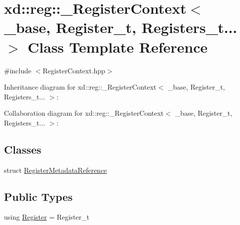 \hypertarget{classxd_1_1reg_1_1___register_context_3_01__base_00_01_register__t_00_01_registers__t_8_8_8_01_4}{}\section{xd\+:\+:reg\+:\+:\+\_\+\+Register\+Context$<$ \+\_\+base, Register\+\_\+t, Registers\+\_\+t... $>$ Class Template Reference}
\label{classxd_1_1reg_1_1___register_context_3_01__base_00_01_register__t_00_01_registers__t_8_8_8_01_4}


{\ttfamily \#include $<$Register\+Context.\+hpp$>$}



Inheritance diagram for xd\+:\+:reg\+:\+:\+\_\+\+Register\+Context$<$ \+\_\+base, Register\+\_\+t, Registers\+\_\+t... $>$\+:


Collaboration diagram for xd\+:\+:reg\+:\+:\+\_\+\+Register\+Context$<$ \+\_\+base, Register\+\_\+t, Registers\+\_\+t... $>$\+:
\subsection*{Classes}
\begin{DoxyCompactItemize}
\item 
struct \mbox{\hyperlink{structxd_1_1reg_1_1___register_context_3_01__base_00_01_register__t_00_01_registers__t_8_8_8_01_fe5bcf2cd3858a6b9eb182cc9b3be39a}{Register\+Metadata\+Reference}}
\end{DoxyCompactItemize}
\subsection*{Public Types}
\begin{DoxyCompactItemize}
\item 
using \mbox{\hyperlink{classxd_1_1reg_1_1___register_context_3_01__base_00_01_register__t_00_01_registers__t_8_8_8_01_4_ac0bf9580e40d5a0ed29d3ea9fc36ac89}{Register}} = Register\+\_\+t
\end{DoxyCompactItemize}
